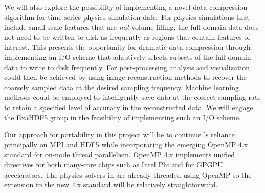 We will also explore the possibility of implementing a novel data compression algorithm for time-series physics simulation data.
For physics simulations that include small scale features that are {\it not} volume-filling, the full domain data does not need to be written to disk as frequently as regions that contain features of interest.
This presents the opportunity for dramatic data compression through implementing an I/O scheme that adaptively selects subsets of the full domain data to write to disk frequently.
For post-processing analysis and visualization could then be achieved by using image reconstruction methods to recover the coarsely sampled data at the desired sampling frequency.
Machine learning methods could be employed to intelligently save data at the correct sampling rate to retain a specified level of accuracy in the reconstructed data.
We will engage the ExaHDF5 group in the feasibility of implementing such an I/O scheme.

Our approach for portability in this project will be to continue \flash's reliance principally on MPI and HDF5 while incorporating the emerging OpenMP 4.x standard for on-node thread parallelism.
OpenMP 4.x implements unified directives for both many-core chips such as Intel Phi and for GPGPU accelerators.
The physics solvers in \flash are already threaded using OpenMP so the extension to the new 4.x standard will be relatively straightforward.


